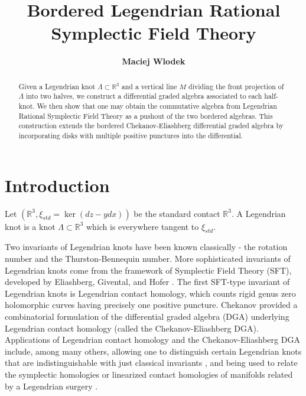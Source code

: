 \documentclass[a4paper,final, reqno]{amsart}
\author[M. Wlodek]{\bfseries Maciej Wlodek} %
\theoremstyle{plain}
\theoremstyle{definition}
\begin{document}
	
	
	\title{Bordered Legendrian Rational Symplectic Field Theory}
	
	
	
	
	
	
	
	
	\begin{abstract} 
		Given a Legendrian knot $\Lambda \subset \mathbb{R}^3$ and a vertical line $M$ dividing the front projection of $\Lambda$ into two halves, we construct a differential graded algebra associated to each half-knot. We then show that one may obtain the commutative algebra from Legendrian Rational Symplectic Field Theory as a pushout of the two bordered algebras. This construction extends the bordered Chekanov-Eliashberg differential graded algebra by incorporating disks with multiple positive punctures into the differential.
	\end{abstract}
	
	\maketitle
	
	
	\section{Introduction}
	
	Let $(\mathbb{R}^3, \xi_{std} = \ker(dz-ydx))$ be the standard contact $\mathbb{R}^3$. A Legendrian knot is a knot $\Lambda \subset \mathbb{R}^3$ which is everywhere tangent to $\xi_{std}$. 
	
	Two invariants of Legendrian knots have been known classically - the rotation number and the Thurston-Bennequin number. More sophisticated invariants of Legendrian knots come from the framework of Symplectic Field Theory (SFT), developed by Eliashberg, Givental, and Hofer \cite{egh}. The first SFT-type invariant of Legendrian knots is Legendrian contact homology, which counts rigid genus zero holomorphic curves having precisely one positive puncture. Chekanov \cite{Chekanov} provided a combinatorial formulation of the differential graded algebra (DGA) underlying Legendrian contact homology (called the Chekanov-Eliashberg DGA). Applications of Legendrian contact homology and the Chekanov-Eliashberg DGA include, among many others, allowing one to distinguish certain Legendrian knots that are indistinguishable with just classical invariants \cite{Chekanov}, and being used to relate the symplectic homologies or linearized contact homologies of manifolds related by a Legendrian surgery \cite{bee}. %
	
\end{document}
